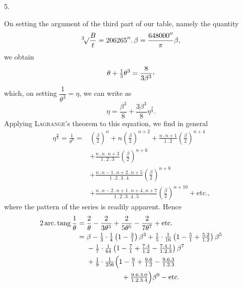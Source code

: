 \par\medskip
{}
\begin{center}5.\end{center}
\noindent\hspace*{\parindent}On setting the argument of the third part of our table, namely the quantity
\[
\BareRoot[3]{\frac{B}{t}}=206265''\mathpunct{.}\beta=\frac{648000''}{\pi}\beta,
\]
we obtain
\[
\theta+\tfrac13\theta^3=\frac{8}{3\beta^3}\mathpunct{\raisebox{.45ex}{,}}
\]
which, on setting \(\dfrac{1}{\theta^3}=\eta\), we can write as
\[
\eta=\frac{\beta^3}{8}+\frac{3\beta^3}{8}\eta^{\frac23}.
\]
Applying \textsc{Lagrange}'s theorem to this equation, we find in general
\[
\begin{aligned}
\eta^{\frac n3}=\frac{1}{\theta^n}={}&\left(\frac{\beta}{2}\right)^n+n\left(\frac{\beta}{2}\right)^{n+2}
+\frac{n\mathpunct{.}n+1}{1\mathpunct{.}2}\left(\frac{\beta}{2}\right)^{n+4}\\
&+\frac{n\mathpunct{.}n\mathpunct{.}n+3}{1\mathpunct{.}2\mathpunct{.}3}\left(\frac{\beta}{2}\right)^{n+6}\\
&+\frac{n\mathpunct{.}n-1\mathpunct{.}n+2\mathpunct{.}n+5}{1\mathpunct{.}2\mathpunct{.}3\mathpunct{.}4}\left(\frac{\beta}{2}\right)^{n+8}\\
&+\frac{n\mathpunct{.}n-2\mathpunct{.}n+1\mathpunct{.}n+4\mathpunct{.}n+7}{1\mathpunct{.}2\mathpunct{.}3\mathpunct{.}4\mathpunct{.}5}\left(\frac{\beta}{2}\right)^{n+10}+\text{etc.,}
\end{aligned}
\]
where the pattern of the series is readily apparent. Hence
\[
\begin{aligned}
2\operatorname{arc.}\operatorname{tang}\frac1\theta
={}&\frac2\theta-\frac2{3\theta^3}+\frac2{5\theta^5}-\frac2{7\theta^7}+\text{etc.}\\
={}&\beta-\tfrac13\cdot\tfrac14\left(1-\tfrac31\right)\beta^3
+\tfrac15\cdot\tfrac1{16}\left(1-\tfrac51+\tfrac{5\mathpunct{.}2}{1\mathpunct{.}2}\right)\beta^5\\
&-\tfrac17\cdot\tfrac1{64}\left(1-\tfrac71+\tfrac{7\mathpunct{.}4}{1\mathpunct{.}2}-\tfrac{7\mathpunct{.}4\mathpunct{.}1}{1\mathpunct{.}2\mathpunct{.}3}\right)\beta^7\\
&+\tfrac19\cdot\tfrac1{256}\Bigl(1-\tfrac91+\tfrac{9\mathpunct{.}6}{1\mathpunct{.}2}-\tfrac{9\mathpunct{.}6\mathpunct{.}3}{1\mathpunct{.}2\mathpunct{.}3}\\
&\hspace{5em}+\tfrac{9\mathpunct{.}6\mathpunct{.}3\mathpunct{.}0}{1\mathpunct{.}2\mathpunct{.}3\mathpunct{.}4}\Bigr)\beta^9-\text{etc.}
\end{aligned}
\]

